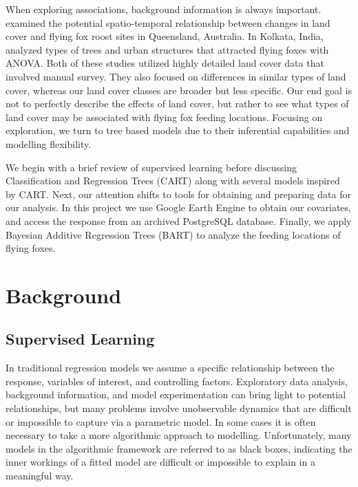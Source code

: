 \documentclass[
  12pt,
  letterpaper,
  DIV=11,
  numbers=noendperiod]{scrartcl}
\begin{document}
When exploring associations, background information is always important.
\cite{queens_lc} examined the potential spatio-temporal relationship
between changes in land cover and flying fox roost sites in Queensland,
Australia. In Kolkata, India, \cite{indian_lc} analyzed types of trees
and urban structures that attracted flying foxes with ANOVA. Both of
these studies utilized highly detailed land cover data that involved
manual survey. They also focused on differences in similar types of land
cover, whereas our land cover classes are broader but less specific. Our
end goal is not to perfectly describe the effects of land cover, but
rather to see what types of land cover may be associated with flying fox
feeding locations. Focusing on exploration, we turn to tree based models
due to their inferential capabilities and modelling flexibility.

We begin with a brief review of supervised learning before discussing
Classification and Regression Trees (CART) \citep{cart} along with
several models inspired by CART. Next, our attention shifts to tools for
obtaining and preparing data for our analysis. In this project we use
Google Earth Engine to obtain our covariates, and access the response
from an archived PostgreSQL database. Finally, we apply Bayesian
Additive Regression Trees (BART) \citep{bart_paper} to analyze the
feeding locations of flying foxes.

\section{Background}\label{sec:background}

\subsection{Supervised Learning}\label{supervised-learning}

In traditional regression models we assume a specific relationship
between the response, variables of interest, and controlling factors.
Exploratory data analysis, background information, and model
experimentation can bring light to potential relationships, but many
problems involve unobservable dynamics that are difficult or impossible
to capture via a parametric model. In some cases it is often necessary
to take a more algorithmic approach to modelling. Unfortunately, many
models in the algorithmic framework are referred to as black boxes,
indicating the inner workings of a fitted model are difficult or
impossible to explain in a meaningful way.
\end{document}
